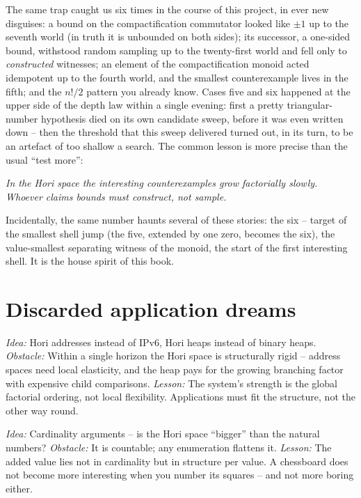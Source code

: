 The same trap caught us six times in the course of this project, in
ever new disguises: a bound on the compactification commutator
looked like $\pm1$ up to the seventh world (in truth it is
unbounded on both sides); its successor, a one-sided bound,
withstood random sampling up to the twenty-first world and fell
only to \emph{constructed} witnesses; an element of the
compactification monoid acted idempotent up to the fourth world,
and the smallest counterexample lives in the fifth; and the $n!/2$
pattern you already know. Cases five and six happened at the upper
side of the depth law within a single evening: first a pretty
triangular-number hypothesis died on its own candidate sweep,
before it was even written down -- then the threshold that this
sweep delivered turned out, in its turn, to be an artefact of too
shallow a search. The common lesson is more precise than the usual
``test more'':

\begin{center}
\emph{In the Hori space the interesting counterexamples grow
factorially slowly.\\ Whoever claims bounds must construct, not
sample.}
\end{center}

Incidentally, the same number haunts several of these stories: the
six -- target of the smallest shell jump (the five, extended by one
zero, becomes the six), the value-smallest separating witness of
the monoid, the start of the first interesting shell. It is the
house spirit of this book.

\section{Discarded application dreams}

\begin{sackgasse}
\emph{Idea:} Hori addresses instead of IPv6, Hori heaps instead of
binary heaps.
\emph{Obstacle:} Within a single horizon the Hori space is
structurally rigid -- address spaces need local elasticity, and the
heap pays for the growing branching factor with expensive child
comparisons.
\emph{Lesson:} The system's strength is the global factorial
ordering, not local flexibility. Applications must fit the
structure, not the other way round.
\end{sackgasse}

\begin{sackgasse}
\emph{Idea:} Cardinality arguments -- is the Hori space ``bigger''
than the natural numbers?
\emph{Obstacle:} It is countable; any enumeration flattens it.
\emph{Lesson:} The added value lies not in cardinality but in
structure per value. A chessboard does not become more interesting
when you number its squares -- and not more boring either.
\end{sackgasse}

